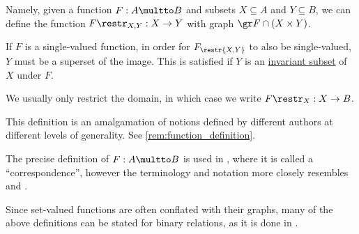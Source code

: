 \begin{definition}
\begin{thmenum}[resume=def:set_valued_function]
    Namely, given a function \( F: A \multto B \) and subsets \( X \subseteq A \) and \( Y \subseteq B \), we can define the function \( F\restr_{X,Y}: X \to Y \) with graph \( \gr F \cap (X \times Y) \).

    If \( F \) is a single-valued function, in order for \( F_\restr{X,Y} \) to also be single-valued, \( Y \) must be a superset of the image. This is satisfied if \( Y \) is an \hyperref[def:invariant_subset]{invariant subset} of \( X \) under \( F \).

    We usually only restrict the domain, in which case we write \( F\restr_X: X \to B \).
  \end{thmenum}
\end{definition}
\begin{comments}
  \item This definition is an amalgamation of notions defined by different authors at different levels of generality. See \cref{rem:function_definition}.

  The precise definition of \( F: A \multto B \) is used in \cite[def. II.3.2]{Bourbaki2004TheoryOfSets}, where it is called a \enquote{correspondence}, however the terminology and notation more closely resembles \cite[def. 1.3.1]{AubinFrankowska1990SetValuedAnalysis} and \cite[1]{DontchevRockafellar2014SolutionMappings}.

  \item Since set-valued functions are often conflated with their graphs, many of the above definitions can be stated for binary relations, as it is done in \cite[8]{Kelley1975GeneralTopology}.
\end{comments}

